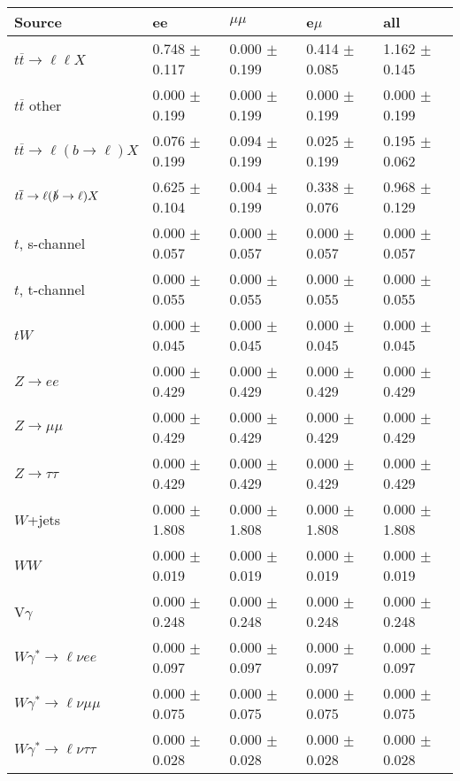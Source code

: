 \begin{tabular}{l | l l l l}
\hline\hline
 Source  &  ee  &  $\mu\mu$  &  e$\mu$  &  all \\
\hline
$t\overline{t}\rightarrow \ell\ell X$ &  0.748 $\pm$  0.117 &  0.000 $\pm$  0.199 &  0.414 $\pm$  0.085 &  1.162 $\pm$  0.145\\
$t\overline{t}$ other &  0.000 $\pm$  0.199 &  0.000 $\pm$  0.199 &  0.000 $\pm$  0.199 &  0.000 $\pm$  0.199\\
$t\overline{t}\rightarrow \ell(b\rightarrow \ell)X$ &  0.076 $\pm$  0.199 &  0.094 $\pm$  0.199 &  0.025 $\pm$  0.199 &  0.195 $\pm$  0.062\\
$t\overline{t}\rightarrow \ell(\slashed{b}\rightarrow \ell)X$ &  0.625 $\pm$  0.104 &  0.004 $\pm$  0.199 &  0.338 $\pm$  0.076 &  0.968 $\pm$  0.129\\
\hline
$t$, s-channel &  0.000 $\pm$  0.057 &  0.000 $\pm$  0.057 &  0.000 $\pm$  0.057 &  0.000 $\pm$  0.057\\
$t$, t-channel &  0.000 $\pm$  0.055 &  0.000 $\pm$  0.055 &  0.000 $\pm$  0.055 &  0.000 $\pm$  0.055\\
$tW$ &  0.000 $\pm$  0.045 &  0.000 $\pm$  0.045 &  0.000 $\pm$  0.045 &  0.000 $\pm$  0.045\\
\hline
$Z\rightarrow ee$ &  0.000 $\pm$  0.429 &  0.000 $\pm$  0.429 &  0.000 $\pm$  0.429 &  0.000 $\pm$  0.429\\
$Z\rightarrow\mu\mu$ &  0.000 $\pm$  0.429 &  0.000 $\pm$  0.429 &  0.000 $\pm$  0.429 &  0.000 $\pm$  0.429\\
$Z\rightarrow\tau\tau$ &  0.000 $\pm$  0.429 &  0.000 $\pm$  0.429 &  0.000 $\pm$  0.429 &  0.000 $\pm$  0.429\\
$W$+jets &  0.000 $\pm$  1.808 &  0.000 $\pm$  1.808 &  0.000 $\pm$  1.808 &  0.000 $\pm$  1.808\\
$WW$ &  0.000 $\pm$  0.019 &  0.000 $\pm$  0.019 &  0.000 $\pm$  0.019 &  0.000 $\pm$  0.019\\
\hline
V$\gamma$ &  0.000 $\pm$  0.248 &  0.000 $\pm$  0.248 &  0.000 $\pm$  0.248 &  0.000 $\pm$  0.248\\
$W\gamma^{*}\rightarrow\ell\nu e e$ &  0.000 $\pm$  0.097 &  0.000 $\pm$  0.097 &  0.000 $\pm$  0.097 &  0.000 $\pm$  0.097\\
$W\gamma^{*}\rightarrow\ell\nu\mu\mu$ &  0.000 $\pm$  0.075 &  0.000 $\pm$  0.075 &  0.000 $\pm$  0.075 &  0.000 $\pm$  0.075\\
$W\gamma^{*}\rightarrow\ell\nu\tau\tau$ &  0.000 $\pm$  0.028 &  0.000 $\pm$  0.028 &  0.000 $\pm$  0.028 &  0.000 $\pm$  0.028\\

\end{tabular}
